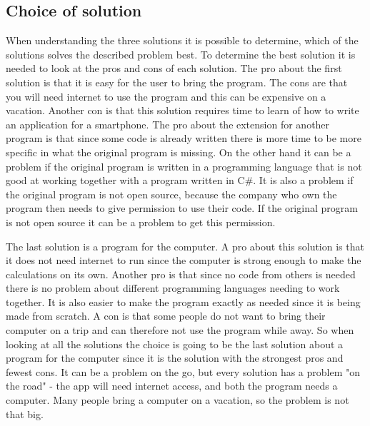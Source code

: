 \subsection{Choice of solution}
When understanding the three solutions it is possible to determine, which of the solutions solves the described problem best. To determine the best solution it is needed to look at the pros and cons of each solution. The pro about the first solution is that it is easy for the user to bring the program. The cons are that you will need internet to use the program and this can be expensive on a vacation. Another con is that this solution requires time to learn of how to write an application for a smartphone.
The pro about the extension for another program is that since some code is already written there is more time to be more specific in what the original program is missing. On the other hand it can be a problem if the original program is written in a programming language that is not good at working together with a program written in C\#. It is also a problem if the original program is not open source, because the company who own the program then needs to give permission to use their code. If the original program is not open source it can be a problem to get this permission. 

The last solution is a program for the computer. A pro about this solution is that it does not need internet to run since the computer is strong enough to make the calculations on its own. Another pro is that since no code from others is needed there is no problem about different programming languages needing to work together. It is also easier to make the program exactly as needed since it is being made from scratch. A con is that some people do not want to bring their computer on a trip and can therefore not use the program while away. So when looking at all the solutions the choice is going to be the last solution about a program for the computer since it is the solution with the strongest pros and fewest cons. It can be a problem on the go, but every solution has a problem "on the road" - the app will need internet access, and both the program needs a computer. Many people bring a computer on a vacation, so the problem is not that big.